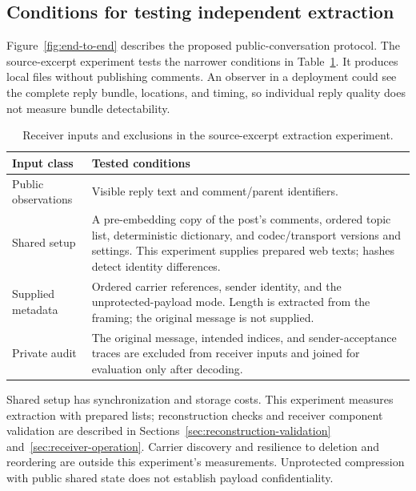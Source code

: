\subsection{Conditions for testing independent extraction}
\label{sec:recovery-contract}
Figure~\ref{fig:end-to-end} describes the proposed public-conversation protocol. The source-excerpt experiment tests the narrower conditions in Table~\ref{tab:recovery-contract}. It produces local files without publishing comments.
An observer in a deployment could see the complete reply bundle, locations, and timing, so individual reply quality does not measure bundle detectability.
\begin{table}[H]
\centering\small
\caption{Receiver inputs and exclusions in the source-excerpt extraction experiment.}
\label{tab:recovery-contract}
\begin{tabularx}{\linewidth}{|l|X|}
\hline
Input class & Tested conditions \\
\hline
Public observations & Visible reply text and comment/parent identifiers. \\
\hline
Shared setup & A pre-embedding copy of the post's comments, ordered topic list, deterministic dictionary, and codec/transport versions and settings. This experiment supplies prepared web texts; hashes detect identity differences. \\
\hline
Supplied metadata & Ordered carrier references, sender identity, and the unprotected-payload mode. Length is extracted from the framing; the original message is not supplied. \\
\hline
Private audit & The original message, intended indices, and sender-acceptance traces are excluded from receiver inputs and joined for evaluation only after decoding. \\
\hline
\end{tabularx}
\end{table}
Shared setup has synchronization and storage costs. This experiment measures extraction with prepared lists; reconstruction checks and receiver component validation are described in Sections~\ref{sec:reconstruction-validation} and~\ref{sec:receiver-operation}. Carrier discovery and resilience to deletion and reordering are outside this experiment's measurements. Unprotected compression with public shared state does not establish payload confidentiality.
\FloatBarrier

